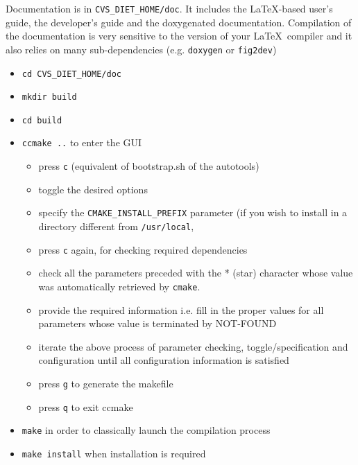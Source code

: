 Documentation is in \verb+CVS_DIET_HOME/doc+. It includes the LaTeX-based 
user's guide, the developer's guide and the doxygenated documentation.
Compilation of the documentation is very sensitive to the version of your
\LaTeX\ compiler and it also relies on many sub-dependencies
  (e.g. \verb+doxygen+ or \verb+fig2dev+)

\begin{itemize}
\item
  \verb+cd CVS_DIET_HOME/doc+
\item
  \verb+mkdir build+
\item
  \verb+cd build+
\item
  \verb+ccmake ..+ to enter the GUI
  \begin{itemize}
  \item press \verb+c+ (equivalent of bootstrap.sh of the autotools)
  \item toggle the desired options 
  \item specify the \verb+CMAKE_INSTALL_PREFIX+ parameter (if you wish
     to install in a directory different from \verb+/usr/local+,
  \item press \verb+c+ again, for checking required dependencies
  \item check all the parameters preceded with the * (star) character
     whose value was automatically retrieved by \verb+cmake+.
  \item provide the required information i.e. fill in the proper values
     for all parameters whose value is terminated by NOT-FOUND
  \item iterate the above process of parameter checking, toggle/specification
     and configuration until all configuration information is satisfied
  \item press \verb+g+ to generate the makefile
  \item press \verb+q+ to exit ccmake
  \end{itemize}
\item
  \verb+make+ in order to classically launch the compilation process
\item
  \verb+make install+ when installation is required
\end{itemize}

